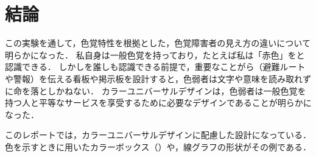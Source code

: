\section{結論}
この実験を通して，色覚特性を根拠とした，色覚障害者の見え方の違いについて明らかになった．
私自身は一般色覚を持っており，たとえば私は「赤色」をと認識できる．
しかしを誰しも認識できる前提で，重要なことがら（避難ルートや警報）を伝える看板や掲示板を設計すると，色弱者は文字や意味を読み取れずに命を落としかねない．
カラーユニバーサルデザインは，色弱者は一般色覚を持つ人と平等なサービスを享受するために必要なデザインであることが明らかになった．\par
このレポートでは，カラーユニバーサルデザインに配慮した設計になっている．色を示すときに用いたカラーボックス（）や，線グラフの形状がその例である．
